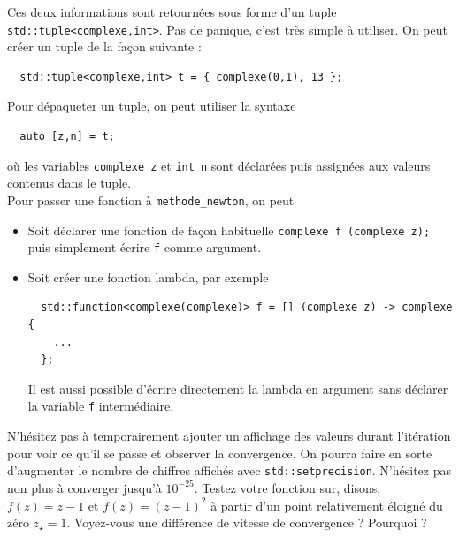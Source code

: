 \documentclass{book}
\newcommand{\inline}[1]{\texttt{#1}}
\begin{document}
Ces deux informations sont retournées sous forme d'un tuple \inline{std::tuple<complexe,int>}. Pas de panique, c'est très simple à utiliser. On peut créer un tuple de la façon suivante :
\begin{verbatim}
  std::tuple<complexe,int> t = { complexe(0,1), 13 };
\end{verbatim}
Pour dépaqueter un tuple, on peut utiliser la syntaxe
\begin{verbatim}
  auto [z,n] = t;
\end{verbatim}
où les variables \inline{complexe z} et \inline{int n} sont déclarées puis assignées aux valeurs contenus dans le tuple.\\

Pour passer une fonction à \inline{methode_newton}, on peut
\begin{itemize}
  \item Soit déclarer une fonction de façon habituelle \inline{complexe f (complexe z);} puis simplement écrire \inline{f} comme argument.
  \item Soit créer une fonction lambda, par exemple
\begin{verbatim}
  std::function<complexe(complexe)> f = [] (complexe z) -> complexe {
    ...
  }; 
\end{verbatim}
  Il est aussi possible d'écrire directement la lambda en argument sans déclarer la variable \texttt{f} intermédiaire.
\end{itemize}

\vspace{1em}
N'hésitez pas à temporairement ajouter un affichage des valeurs durant l'itération pour voir ce qu'il se passe et observer la convergence. On pourra faire en sorte d'augmenter le nombre de chiffres affichés avec \inline{std::setprecision}. N'hésitez pas non plus à converger jusqu'à $10^{-25}$. Testez votre fonction sur, disons, $f(z)=z-1$ et $f(z)=(z-1)^2$ à partir d'un point relativement éloigné du zéro $z_\star=1$. Voyez-vous une différence de vitesse de convergence ? Pourquoi ?\\
\end{document}
